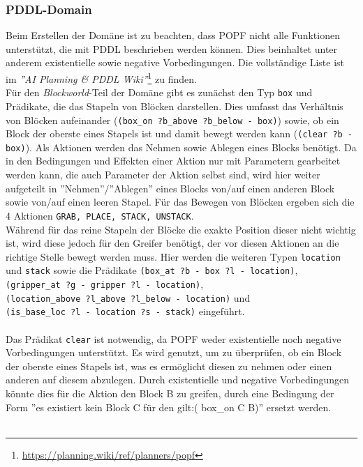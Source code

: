 \subsubsection{PDDL-Domain}
Beim Erstellen der Domäne ist zu beachten, dass \ac{POPF} nicht alle Funktionen unterstützt, die mit PDDL beschrieben werden können.
Dies beinhaltet unter anderem existentielle sowie negative Vorbedingungen.
Die vollständige Liste ist im \emph{''AI Planning \& PDDL Wiki''}\footnote{\url{https://planning.wiki/ref/planners/popf}} zu finden.\\
Für den \emph{Blockworld}-Teil der Domäne gibt es zunächst den Typ \verb|box| und Prädikate, die das Stapeln von Blöcken darstellen.
Dies umfasst das Verhältnis von Blöcken aufeinander (\verb|(box_on ?b_above ?b_below - box)|) sowie, ob ein Block der oberste eines Stapels ist und damit bewegt werden kann (\verb|(clear ?b - box)|).
Als Aktionen werden das Nehmen sowie Ablegen eines Blocks benötigt.
Da in den Bedingungen und Effekten einer Aktion nur mit Parametern gearbeitet werden kann, die auch Parameter der Aktion selbst sind, wird hier weiter aufgeteilt in ''Nehmen''/''Ablegen'' eines Blocks von/auf einen anderen Block sowie von/auf einen leeren Stapel.
Für das Bewegen von Blöcken ergeben sich die 4 Aktionen \verb|GRAB, PLACE, STACK, UNSTACK|.\\
Während für das reine Stapeln der Blöcke die exakte Position dieser nicht wichtig ist, wird diese jedoch für den Greifer benötigt, der vor diesen Aktionen an die richtige Stelle bewegt werden muss.
Hier werden die weiteren Typen \verb|location| und \verb|stack| sowie die Prädikate \verb|(box_at ?b - box ?l - location)|,\\ \verb|(gripper_at ?g - gripper ?l - location)|,\\ \verb|(location_above ?l_above ?l_below - location)| und\\ \verb|(is_base_loc ?l - location ?s - stack)| eingeführt.\\ \\
Das Prädikat \verb|clear| ist notwendig, da \ac{POPF} weder existentielle noch negative Vorbedingungen unterstützt.
Es wird genutzt, um zu überprüfen, ob ein Block der oberste eines Stapels ist, was es ermöglicht diesen zu nehmen oder einen anderen auf diesem abzulegen.
Durch existentielle und negative Vorbedingungen könnte dies für die Aktion den Block B zu greifen, durch eine Bedingung der Form ''es existiert kein Block C für den gilt:( box\_on C B)'' ersetzt werden. \\ \\
